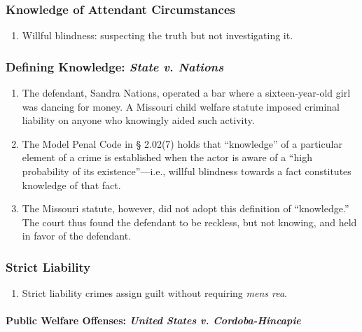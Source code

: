 \subsubsection{Knowledge of Attendant Circumstances}

\begin{enumerate}
    \item Willful blindness: suspecting the truth but not investigating it.
\end{enumerate}

\subsubsection{Defining Knowledge: \emph{State v. Nations}}

\begin{enumerate}
    \item The defendant, Sandra Nations, operated a bar where a sixteen-year-old girl was dancing for money. A Missouri child welfare statute imposed criminal liability on anyone who knowingly aided such activity.
    \item The Model Penal Code in § 2.02(7) holds that ``knowledge'' of a particular element of a crime is established when the actor is aware of a ``high probability of its existence''---i.e., willful blindness towards a fact constitutes knowledge of that fact.
    \item The Missouri statute, however, did not adopt this definition of ``knowledge.'' The court thus found the defendant to be reckless, but not knowing, and held in favor of the defendant.
\end{enumerate}

\subsubsection{Strict Liability}

\begin{enumerate}
    \item Strict liability crimes assign guilt without requiring \emph{mens rea}.
\end{enumerate}

\paragraph{Public Welfare Offenses: \emph{United States v. Cordoba-Hincapie}}

